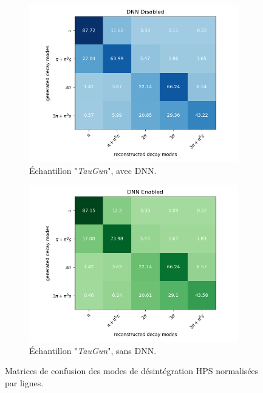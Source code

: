 \begin{figure}[!ht]
\begin{subfigure}{0.5\linewidth}
    \centering
    \includegraphics[width=1\linewidth]{Chapitre4/Images/DMmatrices/Matrix_DNNDisabled_10taus.png} 
    \caption{Échantillon "\textit{TauGun}", avec DNN.}
    \vspace{0.5ex}
  \end{subfigure}
  \begin{subfigure}{0.5\linewidth}
    \centering
    \includegraphics[width=1\linewidth]{Chapitre4/Images/DMmatrices/Matrix_DNNEnabled_10taus.png} 
    \caption{Échantillon "\textit{TauGun}", sans DNN.}
    \vspace{0.5ex}
  \end{subfigure} 
  \caption{Matrices de confusion des modes de désintégration HPS normalisées par lignes.}
  \label{DMmatrix}
\end{figure}

